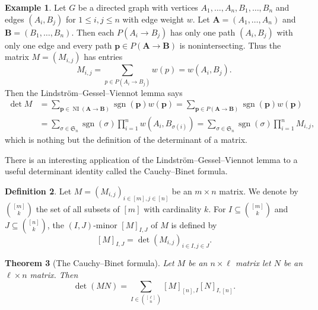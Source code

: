 \documentclass[oneside]{book}
\numberwithin{equation}{section}
\newtheorem{thm}{Theorem}[section]
\theoremstyle{definition}
\newtheorem{exam}[thm]{Example}
\newtheorem{defn}[thm]{Definition}
\newcommand\NI{\operatorname{NI}}
\newcommand\sgn{\operatorname{sgn}}
\newcommand\sym{\mathfrak{S}}
\renewcommand\vec[1]{\bm{#1}}
\begin{document}
\begin{exam}
  Let \( G \) be a directed graph with vertices
  \( A_1,\dots,A_n, B_1,\dots,B_n \) and edges \( (A_i,B_j) \) for
  \( 1\le i,j\le n \) with edge weight \( w \). Let
  \( \vec A = (A_1,\dots,A_n) \) and \( \vec B = (B_1,\dots,B_n) \).
  Then each \( P(A_i\to B_j) \) has only one path \( (A_i,B_j) \) with
  only one edge and every path \( \vec p \in P(\vec A \to \vec B) \)
  is nonintersecting. Thus the matrix \( M=(M_{i,j}) \) has entries
  \[
    M_{i,j} = \sum_{p\in P(A_i\to B_j)} w(p) = w(A_i,B_j).
  \]
  Then the Lindstr\"om--Gessel--Viennot lemma says
  \begin{align*}
    \det M
    &= \sum_{\vec p \in \NI(\vec A \to \vec B)} \sgn(\vec p) w(\vec p)
    = \sum_{\vec p \in P(\vec A \to \vec B)} \sgn(\vec p) w(\vec p)\\
    &= \sum_{\sigma\in\sym_n} \sgn(\sigma) \prod_{i=1}^{n} w(A_i,B_{\sigma(i)})
    = \sum_{\sigma\in\sym_n} \sgn(\sigma) \prod_{i=1}^{n} M_{i,j},
  \end{align*}
  which is nothing but the definition of the determinant of a matrix.
\end{exam}

There is an interesting application of the
Lindstr\"om--Gessel--Viennot lemma to a useful determinant identity
called the Cauchy--Binet formula.

\begin{defn}\label{def:6}
  Let \( M = (M_{i,j})_{i\in [m], j\in [n]} \) be an \( m\times n \)
  matrix. We denote by \( \binom{[m]}{k} \) the set of all subsets of
  \( [m] \) with cardinality \( k \). For
  \( I\subseteq \binom{[m]}{k} \) and \( J\subseteq \binom{[n]}{k} \),
  the \( (I,J) \)-minor \( [M]_{I,J} \) of \( M \) 
  is defined by
  \[
    [M]_{I,J} = \det (M_{i,j})_{i\in I,j\in J}.
  \]
\end{defn}

\begin{thm}[The Cauchy--Binet formula]\label{thm:7}
  Let \( M \) be an \( n\times \ell \) matrix let \( N \) be an
  \( \ell\times n \) matrix.
  Then
  \[
    \det (MN) = \sum_{I\in \binom{[\ell]}{n}} [M]_{[n],I} [N]_{I,[n]}.
  \]
\end{thm}
\end{document}

